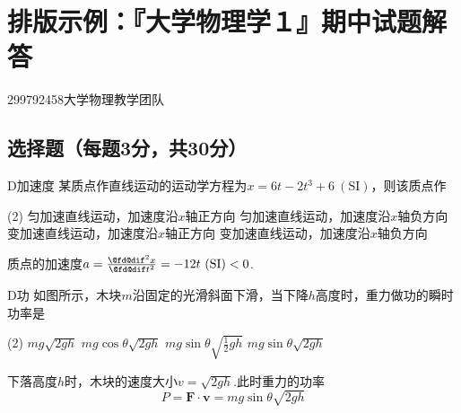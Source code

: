 \chapter{排版示例：『大学物理学１』期中试题解答}
\date{闭卷，允许携带\underline{\textbf{无存储功能的计算器}}入场}{\zhtoday}{299792458}{大学物理教学团队}
\section{选择题（每题3分，共30分）}
{
\begin{choice}{D}{加速度}
    某质点作直线运动的运动学方程为$x=6t-2t^3+6\ (\mathrm{SI})$，则该质点作
    \begin{tasks}(2)
        \task 匀加速直线运动，加速度沿$x$轴正方向
        \task 匀加速直线运动，加速度沿$x$轴负方向
        \task 变加速直线运动，加速度沿$x$轴正方向
        \task 变加速直线运动，加速度沿$x$轴负方向
    \end{tasks}
\end{choice}
\begin{solution}
    质点的加速度$a=\frac{\d^2 x}{\d t^2}=-12t\ (\mathrm{SI})<0$.
\end{solution}

\hspace{-2.16em}
\begin{minipage}{0.67\textwidth}
\begin{choice}{D}{功}
    如图所示，木块$m$沿固定的光滑斜面下滑，当下降$h$高度时，重力做功的瞬时功率是
    \begin{tasks}(2)
        \task $mg\sqrt{2gh}$
        \task $mg\cos{\theta}\sqrt{2gh}$
        \task $mg\sin{\theta}\sqrt{\frac{1}{2}gh}$
        \task $mg\sin{\theta}\sqrt{2gh}$
    \end{tasks}
\end{choice}
\end{minipage}
\hfill
\begin{minipage}[c]{0.33\textwidth}
\begin{center}
\end{center}
\end{minipage}
\begin{solution}
    下落高度$h$时，木块的速度大小$v=\sqrt{2gh}$.此时重力的功率
    $$P=\boldsymbol{F}\cdot\boldsymbol{v}=mg\sin{\theta}\sqrt{2gh}$$
\end{solution}

}
